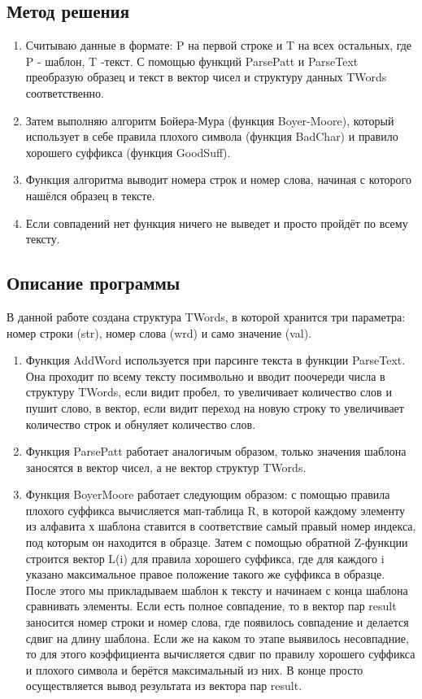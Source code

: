 \documentclass[12pt]{article}
\begin{document}
\subsection*{Метод решения}

\begin{enumerate}
\item  Считываю данные в формате: P на первой строке и T на всех остальных, где P - шаблон, T -текст. С помощью функций ParsePatt и ParseText преобразую образец и текст в вектор чисел и структуру данных TWords соответственно.
\item Затем выполняю алгоритм Бойера-Мура (функция Boyer-Moore), который использует в себе правила плохого символа (функция BadChar) и правило хорошего суффикса (функция GoodSuff).
\item Функция алгоритма выводит номера строк и номер слова, начиная с которого нашёлся образец в тексте.
\item Если совпадений нет функция ничего не выведет и просто пройдёт по всему тексту.
\end{enumerate}

\subsection*{Описание программы}

В данной работе создана структура TWords, в которой хранится три параметра: номер строки (str), номер слова (wrd) и само значение (val). 
\begin{enumerate}
\item Функция AddWord используется при парсинге текста в функции ParseText. Она проходит по всему тексту посимвольно и вводит поочереди числа в структуру TWords, если видит пробел, то увеличивает количество слов и пушит слово, в вектор, если видит переход на новую строку то увеличивает количество строк и обнуляет количество слов.

\item Функция ParsePatt работает аналогичым образом, только значения шаблона заносятся в вектор чисел, а не вектор структур TWords.

\item Функция BoyerMoore работает следующим образом: с помощью правила плохого суффикса вычисляется мап-таблица R, в которой каждому элементу из алфавита х шаблона ставится в соответствие самый правый номер индекса, под которым он находится в образце. Затем с помощью обратной Z-функции строится вектор L(i) для правила хорошего суффикса, где для каждого i указано максимальное правое положение такого же суффикса в образце. После этого мы прикладываем шаблон к тексту и начинаем с конца шаблона сравнивать элементы. Если есть полное совпадение, то в вектор пар result заносится номер строки и номер слова, где появилось совпадение и делается сдвиг на длину шаблона. Если же на каком то этапе выявилось несовпадние, то для этого коэффициента вычисляется сдвиг по правилу хорошего суффикса и плохого символа и берётся максимальный из них. В конце просто осуществляется вывод результата из вектора пар result.
\end{enumerate}
\end{document}
